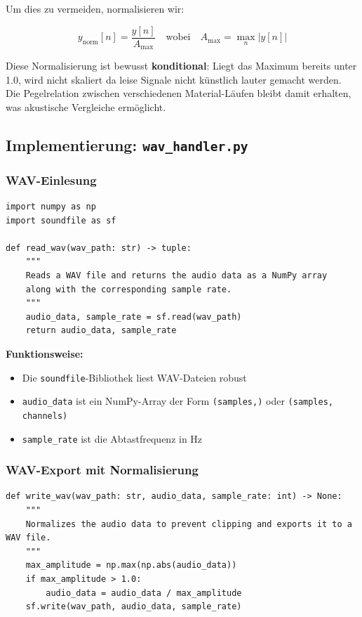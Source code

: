 Um dies zu vermeiden, normalisieren wir:

$$y_{\text{norm}}[n] = \frac{y[n]}{A_{\max}} \quad \text{wobei} \quad A_{\max} = \max_n |y[n]|$$

Diese Normalisierung ist bewusst \textbf{konditional}: Liegt das Maximum bereits
unter 1.0, wird nicht skaliert da leise Signale nicht k\"unstlich lauter gemacht werden.
Die Pegelrelation zwischen verschiedenen Material-L\"aufen bleibt damit
erhalten, was akustische Vergleiche erm\"oglicht.

\subsection{Implementierung: \texttt{wav\_handler.py}}

\subsubsection{WAV-Einlesung}

\begin{lstlisting}
import numpy as np
import soundfile as sf

def read_wav(wav_path: str) -> tuple:
    """
    Reads a WAV file and returns the audio data as a NumPy array
    along with the corresponding sample rate.
    """
    audio_data, sample_rate = sf.read(wav_path)
    return audio_data, sample_rate
\end{lstlisting}

\textbf{Funktionsweise:}

\begin{itemize}
    \item Die \texttt{soundfile}-Bibliothek liest WAV-Dateien robust
    \item \texttt{audio\_data} ist ein NumPy-Array der Form \texttt{(samples,)} oder \texttt{(samples, channels)}
    \item \texttt{sample\_rate} ist die Abtastfrequenz in Hz
\end{itemize}

\subsubsection{WAV-Export mit Normalisierung}

\begin{lstlisting}
def write_wav(wav_path: str, audio_data, sample_rate: int) -> None:
    """
    Normalizes the audio data to prevent clipping and exports it to a WAV file.
    """
    max_amplitude = np.max(np.abs(audio_data))
    if max_amplitude > 1.0:
        audio_data = audio_data / max_amplitude
    sf.write(wav_path, audio_data, sample_rate)
\end{lstlisting}

